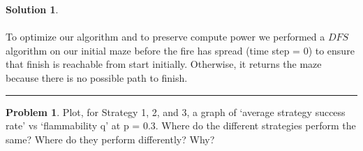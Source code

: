\documentclass{article}
\theoremstyle{definition}
\newtheorem{problem}{Problem}
\def\fline{\rule{0.75\linewidth}{0.5pt}}
\newcommand{\finishline}{\vspace{-15pt}\begin{center}\fline\end{center}}
\newtheorem*{solution*}{Solution}
\newenvironment{solution}{\begin{solution*}}{{\finishline} \end{solution*}}
\begin{document}
\begin{solution}
	\\\\
	To optimize our algorithm and to preserve compute power we performed a $DFS$ algorithm on our initial maze before the fire has spread (time step = 0) to ensure that finish is reachable from start initially. Otherwise, it returns the maze because there is no possible path to finish.
	
\end{solution}

\smallskip

\begin{problem}
	Plot, for Strategy 1, 2, and 3, a graph of `average strategy success rate' vs `flammability q' at p = 0.3. Where do the different strategies perform the same? Where do they perform differently? Why?
\end{problem}

\smallskip
\end{document}
